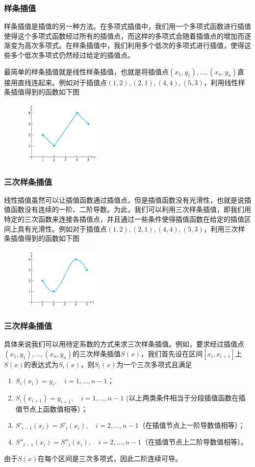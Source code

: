 \documentclass[10pt]{beamer}
\begin{document}
\begin{frame}
\frametitle{样条插值}
样条插值是插值的另一种方法。在多项式插值中，我们用一个多项式函数进行插值使得这个多项式函数经过所有的插值点，而这样的多项式会随着插值点的增加而逐渐变为高次多项式。在样条插值中，我们利用多个低次的多项式进行插值，使得这些多个低次多项式仍然经过给定的插值点。

\vspace{0.2cm}

最简单的样条插值就是线性样条插值，也就是将插值点$(x_1, y_1), \ldots, (x_n,y_n)$直接用直线连起来。例如对于插值点$(1,2), (2,1), (4,4), (5,3)$，利用线性样条插值得到的函数如下图
\begin{figure}
\includegraphics[width=4cm]{figs/3-4_Cubic_Splines-1} 
\end{figure}
\end{frame}


\begin{frame}
\frametitle{三次样条插值}
线性插值虽然可以让插值函数通过插值点，但是插值函数没有光滑性，也就是说插值函数没有连续的一阶、二阶导数。为此，我们可以利用三次样条插值，即我们用特定的三次函数来连接各插值点，并且通过一些条件使得插值函数在给定的插值区间上具有光滑性。例如对于插值点$(1,2), (2,1), (4,4), (5,3)$，利用三次样条插值得到的函数如下图
\begin{figure}
\includegraphics[width=4cm]{figs/3-4_Cubic_Splines-2} 
\end{figure}
\end{frame}


\begin{frame}
\frametitle{三次样条插值}
具体来说我们可以用待定系数的方式来求三次样条插值。例如，要求经过插值点$(x_1, y_1), \ldots, (x_n,y_n)$的三次样条插值$S(x)$，我们首先设在区间$[x_i, x_{i+1}]$上$S(x)$的表达式为$S_i(x)$，则$S_i(x)$为一个三次多项式且满足
\begin{enumerate}
\item $S_i(x_i) = y_i, \quad i = 1, \ldots, n-1$；
\item $S_i(x_{i+1}) = y_{i+1},  \quad i = 1, \ldots, n-1$ (以上两类条件相当于分段插值函数在插值节点上函数值相等）；
\item $S'_{i-1}(x_i) = S'_i(x_i), \quad i = 2, \ldots, n-1$（在插值节点上一阶导数值相等）；
\item $S''_{i-1}(x_i) = S''_i(x_i), \quad i = 2, \ldots, n-1$（在插值节点上二阶导数值相等）。
\end{enumerate}
由于$S(x)$在每个区间是三次多项式，因此二阶连续可导。
\end{frame}
\end{document}
